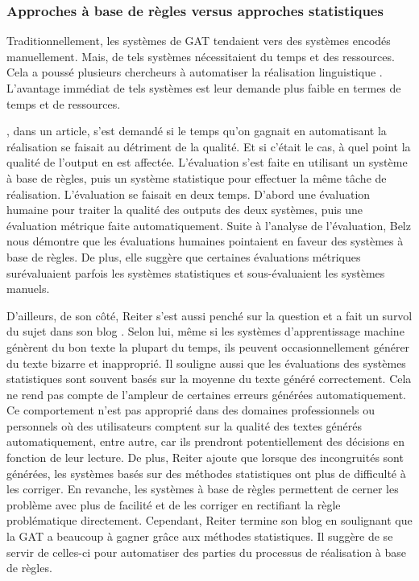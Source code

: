 \subsubsection{Approches à base de règles versus approches statistiques}

Traditionnellement, les systèmes de \ac{GAT} tendaient vers des systèmes encodés manuellement. Mais, de tels systèmes nécessitaient du temps et des ressources. Cela a poussé plusieurs chercheurs à automatiser la réalisation linguistique \citep{LangkildeForestbasedStatisticalSentence2000}. L'avantage immédiat de tels systèmes est leur demande plus faible en termes de temps et de ressources. 

\cite{BelzSystemBuildingCost2009}, dans un article, s'est demandé si le temps qu'on gagnait en automatisant la réalisation se faisait au détriment de la qualité. Et si c'était le cas, à quel point la qualité de l'output en est affectée. L'évaluation s'est faite en utilisant un système à base de règles, puis un système statistique pour effectuer la même tâche de réalisation. L'évaluation se faisait en deux temps. D'abord une évaluation humaine pour traiter la qualité des outputs des deux systèmes, puis une évaluation métrique faite automatiquement. Suite à l'analyse de l'évaluation, Belz nous démontre que les évaluations humaines pointaient en faveur des systèmes à base de règles. De plus, elle suggère que certaines évaluations métriques surévaluaient parfois les systèmes statistiques et sous-évaluaient les systèmes manuels\citep{BelzSystemBuildingCost2009}.  

D'ailleurs, de son côté, Reiter s'est aussi penché sur la question et a fait un survol du sujet dans son blog \citep{ReiterNaturalLanguageGeneration2016} . Selon lui, même si les systèmes d'apprentissage machine génèrent du bon texte la plupart du temps, ils peuvent occasionnellement générer du texte bizarre et inapproprié. Il souligne aussi que les évaluations des systèmes statistiques sont souvent basés sur la moyenne du texte généré correctement. Cela ne rend pas compte de l'ampleur de certaines erreurs générées automatiquement. Ce comportement n'est pas approprié dans des domaines professionnels ou personnels où des utilisateurs comptent sur la qualité des textes générés automatiquement, entre autre, car ils prendront potentiellement des décisions en fonction de leur lecture. De plus, Reiter ajoute que lorsque des incongruités sont générées, les systèmes basés sur des méthodes statistiques ont plus de difficulté à les corriger. En revanche, les systèmes à base de règles permettent de cerner les problème avec plus de facilité et de les corriger en rectifiant la règle problématique directement. Cependant, Reiter termine son blog en soulignant que la \ac{GAT} a beaucoup à gagner grâce aux méthodes statistiques. Il suggère de se servir de celles-ci pour automatiser des parties du processus de réalisation à base de règles.

